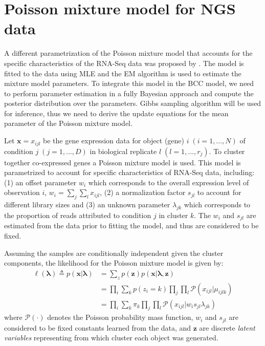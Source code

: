 \chapter{Poisson mixture model for NGS data}
A different parametrization of the Poisson mixture model that accounts for the specific characteristics of the RNA-Seq data was proposed by \citet{Rau2013}. The model is fitted to the data using MLE and the EM algorithm is used to estimate the mixture model parameters. To integrate this model in the BCC model, we need to perform parameter estimation in a fully Bayesian approach and compute the posterior distribution over the parameters. Gibbs sampling algorithm will be used for inference, thus we need to derive the update equations for the mean parameter of the Poisson mixture model.

Let $\mathbf{x}=x_{ijl}$ be the gene expression data for object (\ie gene) $i \;(i = 1,...,N)$ of condition $j \; (j=1,...,D)$ in biological replicate $l \; (l=1,...,r_{j})$. To cluster together co-expressed genes a Poisson mixture model is used. This model is parametrized to account for specific characteristics of RNA-Seq data, including:
(1) an offset parameter $w_{i}$ which corresponds to the overall expression level of observation $i$, \ie $w_{i} = \sum\limits_{j}\sum\limits_{l} x_{ijl}$, (2) a normalization factor $s_{jl}$ to account for different library sizes and (3) an unknown parameter $\lambda_{jk}$ which corresponds to the proportion of reads attributed to condition $j$ in cluster $k$. The $w_{i}$ and $s_{jl}$ are estimated from the data prior to fitting the model, and thus are considered to be fixed.

Assuming the samples are conditionally independent given the cluster components, the likelihood for the Poisson mixture model is given by:
\begin{equation} \label{poisson-log-lin-mm-app}
  \begin{split}
	\ell(\mathbf{\lambda}) \triangleq p(\mathbf{x} | \mathbf{\lambda}) & = \sum\limits_{z} p(\mathbf{z}) p(\mathbf{x} | \mathbf{\lambda}, \mathbf{z})\\
		& = \prod_{i} \sum_{k} p(z_{i} = k) \prod_{j} \prod_{l} \mathcal{P}(x_{ijl} | \mu_{ijlk}) \\
		& = \prod_{i} \sum_{k} \pi_{k} \prod_{j} \prod_{l} \mathcal{P}(x_{ijl} | w_{i}s_{jl} \lambda_{jk})
  \end{split}
\end{equation}
where $\mathcal{P}(\cdot)$ denotes the Poisson probability mass function, $w_{i}$ and $s_{jl}$ are considered to be fixed constants learned from the data, and $\mathbf{z}$ are discrete \emph{latent variables} representing from which cluster each object was generated. 

